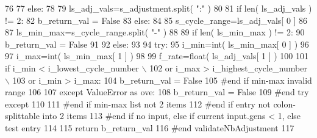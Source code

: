 \begin{DoxyCode}
76 
77     \textcolor{keywordflow}{else}:
78 
79         ls\_adj\_vals=s\_adjustment.split( \textcolor{stringliteral}{":"} )
80 
81         \textcolor{keywordflow}{if} len( ls\_adj\_vals ) != 2:
82             b\_return\_val = \textcolor{keyword}{False}
83         \textcolor{keywordflow}{else}:
84 
85             s\_cycle\_range=ls\_adj\_vals[ 0 ]
86 
87             ls\_min\_max=s\_cycle\_range.split( \textcolor{stringliteral}{"-"} )           
88 
89             \textcolor{keywordflow}{if} len( ls\_min\_max ) != 2:
90                 b\_return\_val = \textcolor{keyword}{False}
91 
92             \textcolor{keywordflow}{else}:
93 
94                 \textcolor{keywordflow}{try}:
95                     i\_min=int( ls\_min\_max[ 0 ] )
96 
97                     i\_max=int( ls\_min\_max[ 1 ] )
98 
99                     f\_rate=float( ls\_adj\_vals[ 1 ] )
100                     
101                     \textcolor{keywordflow}{if} i\_min < i\_lowest\_cycle\_number \(\backslash\)
102                             \textcolor{keywordflow}{or} i\_max > i\_highest\_cycle\_number \(\backslash\)
103                             \textcolor{keywordflow}{or} i\_min > i\_max:
104                         b\_return\_val = \textcolor{keyword}{False}
105                     \textcolor{comment}{#end if min-max invalid range}
106 
107                 \textcolor{keywordflow}{except} ValueError \textcolor{keyword}{as} ove:
108                     b\_return\_val = \textcolor{keyword}{False}
109                 \textcolor{comment}{#end try except}
110 
111             \textcolor{comment}{#end if min-max list not 2 items}
112         \textcolor{comment}{#end if entry not colon-splittable into 2 items}
113     \textcolor{comment}{#end if no input, else if current input.gens < 1, else test entry}
114 
115     \textcolor{keywordflow}{return} b\_return\_val
116 \textcolor{comment}{#end validateNbAdjustment}
117 
\end{DoxyCode}
